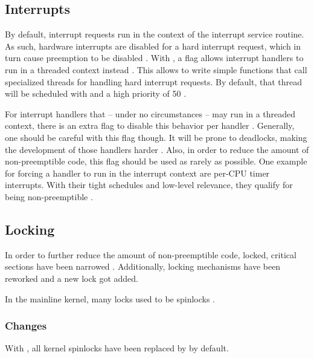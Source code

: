 \documentclass[10pt,twocolumn,a4paper]{article}
\begin{document}
\subsection{Interrupts}\label{subsec:interrupts}
By default, interrupt requests run in the context of the interrupt service routine.
As such, hardware interrupts are disabled for a hard interrupt request, which in turn cause preemption to be disabled \cite{lf:irq}.
With , a flag allows interrupt handlers to run in a threaded context instead \cite{reghenzani_realtime_2019, lf:irq}.
This allows to write simple functions that call specialized threads for handling hard interrupt requests\cite{reghenzani_realtime_2019}.
By default, that thread will be scheduled with  and a high priority of 50 \cite{lf:irq}.

For interrupt handlers that -- under no circumstances -- may run in a threaded context, there is an extra flag to disable this behavior per handler \cite{lf:irq}.
Generally, one should be careful with this flag though.
It will be prone to deadlocks, making the development of those handlers harder \cite{mckenney_realtime_2005}.
Also, in order to reduce the amount of non-preemptible code, this flag should be used as rarely as possible.
One example for forcing a handler to run in the interrupt context are per-CPU timer interrupts.
With their tight schedules and low-level relevance, they qualify for being non-preemptible \cite{mckenney_realtime_2005}.

\subsection{Locking}\label{subsec:locking}
In order to further reduce the amount of non-preemptible code, locked, critical sections have been narrowed \cite{mckenney_realtime_2005}.
Additionally, locking mechanisms have been reworked and a new lock got added.

In the mainline kernel, many locks used to be spinlocks \cite{lf:sleeping-spinlocks}.

\subsubsection{Changes}
With , all  kernel spinlocks have been replaced by  by default.
\end{document}
